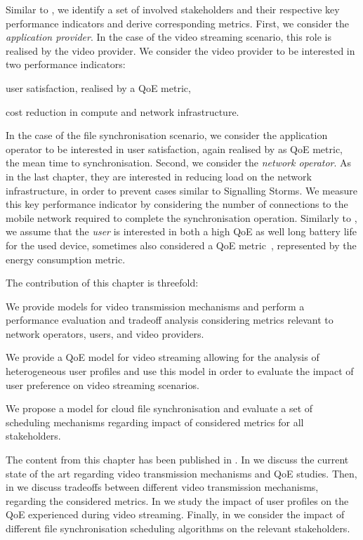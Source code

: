 Similar to , we identify a set of involved stakeholders and their respective key performance indicators and derive corresponding metrics.
First, we consider the \emph{application provider}. 
In the case of the video streaming scenario, this role is realised by the video provider.
We consider the video provider to be interested in two performance indicators: 
\begin{enumerate*}
\item user satisfaction, realised by a \gls{QoE} metric,
\item cost reduction in compute and network infrastructure.
\end{enumerate*}
In the case of the file synchronisation scenario, we consider the application operator to be interested in user satisfaction, again realised by as \gls{QoE} metric, the mean time to synchronisation.
Second, we consider the \emph{network operator}.
As in the last chapter, they are interested in reducing load on the network infrastructure, in order to prevent cases similar to Signalling Storms.
We measure this key performance indicator by considering the number of connections to the mobile network required to complete the synchronisation operation.
Similarly to , we assume that the \emph{user} is interested in both a high \gls{QoE} as well long battery life for the used device, sometimes also considered a \gls{QoE} metric~\cite{Ickin2012}, represented by the energy consumption metric. 

The contribution of this chapter is threefold:
\begin{enumerate*}
\item We provide models for video transmission mechanisms and perform a performance evaluation and tradeoff analysis considering metrics relevant to network operators, users, and video providers.
\item We provide a \gls{QoE} model for video streaming allowing for the analysis of heterogeneous user profiles and use this model in order to evaluate the impact of user preference on video streaming scenarios.
\item We propose a model for cloud file synchronisation and evaluate a set of scheduling mechanisms regarding impact of considered metrics for all stakeholders.
\end{enumerate*}

The content from this chapter has been published in \cite{Schwartz2013b, Hossfeld2015, Schwartz2014a}.
In  we discuss the current state of the art regarding video transmission mechanisms and \gls{QoE} studies.
Then, in  we discuss tradeoffs between different video transmission mechanisms, regarding the considered metrics.
In  we study the impact of user profiles on the \gls{QoE} experienced during video streaming.
Finally, in  we consider the impact of different file synchronisation scheduling algorithms on the relevant stakeholders.





